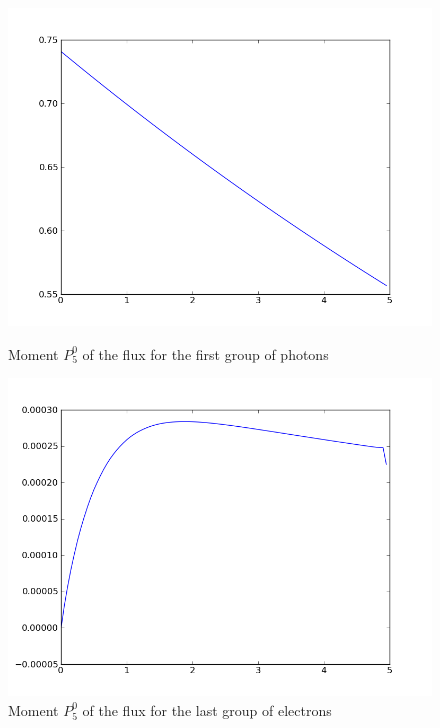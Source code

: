 \begin{figure}[H]
\begin{minipage}[b]{0.45\linewidth}
\centering
\includegraphics[width=\linewidth]{./images/al/group_0_moment_30}
\caption{Moment $P_5^0$ of the flux for the first group of photons}
\end{minipage}
\hspace{0.5cm}
\begin{minipage}[b]{0.45\linewidth}
\centering
\includegraphics[width=\linewidth]{./images/al/group_39_moment_30}
\caption{Moment $P_5^0$ of the flux for the last group of electrons}
\end{minipage}
\end{figure}

